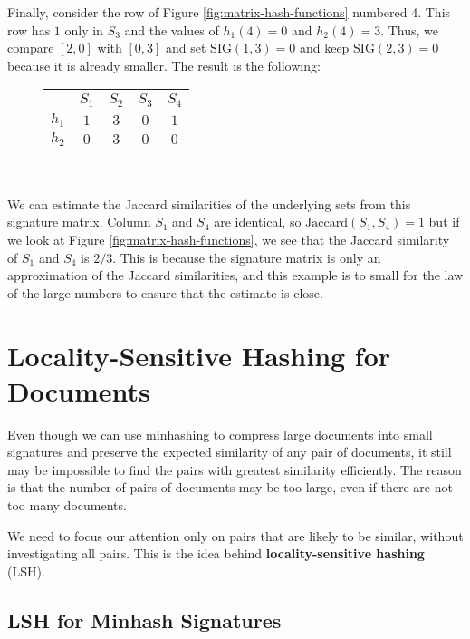 Finally, consider the row of Figure \ref{fig:matrix-hash-functions} numbered 4. This row has $1$ only in $S_3$ and the values of $h_1(4) = 0$ and $h_2(4) = 3$. Thus, we compare $[2, 0]$ with $[0, 3]$ and set $\text{SIG}(1, 3) = 0$ and keep $\text{SIG}(2, 3) = 0$ because it is already smaller. The result is the following:

\begin{figure}[H]
\centering
\begin{tabular}{|c||c|c|c|c|}
  \hline
   & $S_1$ & $S_2$ & $S_3$ & $S_4$\\
  \hline
  $h_1$ & $1$ & $3$ & $0$ & $1$ \\ 
  $h_2$ & $0$ & $3$ & $0$ & $0$ \\
  \hline
\end{tabular}
\captionsetup{justification=centering}\\
\label{fig:sig-matrix-3}
\end{figure}

We can estimate the Jaccard similarities of the underlying sets from this signature matrix. Column $S_1$ and $S_4$ are identical, so $\text{Jaccard}(S_1, S_4) = 1$ but if we look at Figure \ref{fig:matrix-hash-functions}, we see that the Jaccard similarity of $S_1$ and $S_4$ is $2/3$. This is because the signature matrix is only an approximation of the Jaccard similarities, and this example is to small for the law of the large numbers to ensure that the estimate is close.

\section{Locality-Sensitive Hashing for Documents}\label{sec:lsh-documents}

Even though we can use minhashing to compress large documents into small signatures and preserve the expected similarity of any pair of documents, it still may be impossible to find the pairs with greatest similarity efficiently. The reason is that the number of pairs of documents may be too large, even if there are not too many documents. 

We need to focus our attention only on pairs that are likely to be similar, without investigating all pairs. This is the idea behind \textbf{locality-sensitive hashing} (LSH).

\subsection{LSH for Minhash Signatures}\label{sec:lsh-minhash}
